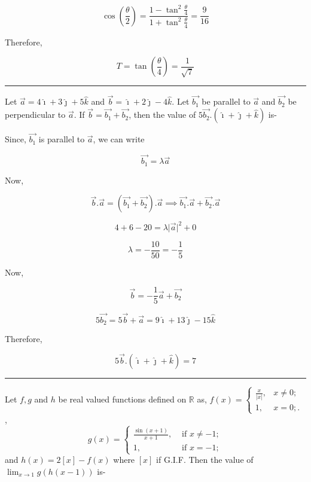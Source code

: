 \documentclass[twocolumn]{article}
\begin{document}
\begin{CJK*}{UTF8}{gbsn}
\[
    \cos (\frac{\theta}{2}) = \frac{1 - \tan ^{2} \frac{\theta}{4} }{1 + \tan ^{2} \frac{\theta}{4}} = \frac{9}{16}
\]

Therefore, 

\[
    \boxed{T = \tan (\frac{\theta}{4}) = \frac{1}{\sqrt{7} }}
\]

\hrule

\begin{question}
    Let \(\vec{a} = 4\hat{\imath} +  3\hat{\jmath} + 5\hat{k} \) and \(\vec{b} = \hat{\imath} + 2\hat{\jmath} - 4\hat{k} \). Let \(\vec{b_1}\) be parallel to \(\vec{a}\) and \(\vec{b_2}\) be perpendicular to \(\vec{a}\). If \(\vec{b} = \vec{b_1} + \vec{b_2} \), then the value of \(5 \vec{b_2} . (\hat{\imath} + \hat{\jmath} + \hat{k})\) is-     
\end{question}

Since, \(\vec{b_1}\) is parallel to \(\vec{a}\), we can write 

\[
    \vec{b_1} = \lambda \vec{a} 
\]

Now,

\[
    \vec{b}. \vec{a} = (\vec{b_1} + \vec{b_2}).\vec{a} \implies \vec{b_1}.\vec{a} + \vec{b_2}.\vec{a} 
\]

\[
    4 + 6 - 20 = \lambda \vert \vec{a}  \vert^{2} + 0 
\]

\[
    \lambda = -\frac{10}{50} = -\frac{1}{5}
\]

Now, 

\[
    \vec{b} = -\frac{1}{5}\vec{a} + \vec{b_2} 
\]

\[
    5\vec{b_2} = 5\vec{b} + \vec{a} = 9\hat{\imath} + 13\hat{\jmath} - 15\hat{k} 
\]

Therefore,

\[
    \boxed{5\vec{b}.(\hat{\imath} + \hat{\jmath} + \hat{k} ) = 7}
\]

\hrule

\begin{question}
    Let \(f, g\) and \(h\) be real valued functions defined on \(\mathbb{R}\) as, \(f(x) = \begin{cases}
            \frac{x}{\vert x \vert }, & x \ne 0  ;\\
            1, & x= 0; .
        \end{cases}\) ,\\
        \[g(x) = \begin{cases}
            \frac{\sin (x+1)}{x+1}, &\text{ if } x \ne -1 ;\\
            1, &\text{ if } x = -1;
        \end{cases}\] and \(h(x) = 2 [x]- f(x)\) where \([x]\) if G.I.F. Then the value of \(\lim_{x \to 1} g(h(x-1))\) is-   
\end{question}


\end{CJK*}
\end{document}
